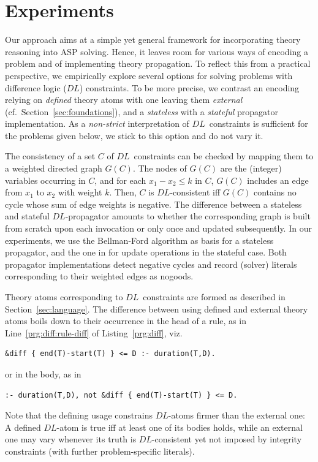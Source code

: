 \documentclass[a4paper,USenglish]{oasics-v2016}
\newcommand{\DL}{\ensuremath{\mathit{DL}}}
\begin{document}
\section{Experiments}\label{sec:experiments}
\newcommand{\TO}{\multicolumn{1}{r|}{TO}}
\newcommand{\TI}{\multicolumn{1}{r|}{T}}

Our approach aims at a simple yet general framework for incorporating theory reasoning into ASP solving.
Hence, it leaves room for various ways of encoding a problem and of implementing theory propagation.
%
To reflect this from a practical perspective,
we empirically explore several options for solving problems with difference logic (\DL) constraints.
%
To be more precise,
we contrast an encoding relying on \emph{defined} theory atoms with one leaving them \emph{external} (cf.\ Section~\ref{sec:foundations}),
and a \emph{stateless} with a \emph{stateful} propagator implementation.
As a \emph{non-strict} interpretation of \DL\ constraints is sufficient
for the problems given below,
we stick to this option and do not vary it.

The consistency of a set $C$ of \DL\ constraints can be checked by mapping them to a weighted directed graph $G(C)$.
The nodes of $G(C)$ are the (integer) variables occurring in $C$,
and for each $x_1 - x_2 \leq k$ in $C$, $G(C)$ includes an edge from $x_1$ to $x_2$ with weight $k$.
Then, $C$ is \DL-consistent iff $G(C)$ contains no cycle whose sum of edge weights is negative.
%
The difference between a stateless and stateful \DL-propagator amounts to whether the corresponding graph is
built from scratch upon each invocation or only once and updated subsequently.
%
In our experiments,
we use the Bellman-Ford algorithm \cite{bellman58a,forful62a} as basis for a stateless propagator,
and the one in \cite{cotmal06a} for update operations in the stateful case.
%
Both propagator implementations detect negative cycles
and record (solver) literals corresponding to their weighted edges as nogoods.

Theory atoms corresponding to \DL\ constraints are formed as described in Section~\ref{sec:language}.
%
The difference between using defined and external theory atoms boils down to their occurrence in the head of a rule,
as in Line~\ref{prg:diff:rule-diff} of Listing~\ref{prg:diff}, viz.\
\begin{lstlisting}[morekeywords={&diff},alsoletter={\&},numbers=none]
&diff { end(T)-start(T) } <= D :- duration(T,D).
\end{lstlisting}
or in the body, as in
\begin{lstlisting}[morekeywords={&diff},alsoletter={\&},numbers=none]
:- duration(T,D), not &diff { end(T)-start(T) } <= D.
\end{lstlisting}
%
Note that the defining usage constrains \DL-atoms firmer than the external one:
A defined \DL-atom is true iff at least one of its bodies holds,
while an external one may vary whenever its truth is \DL-consistent yet
not imposed by integrity constraints (with further problem-specific literals).
\end{document}
